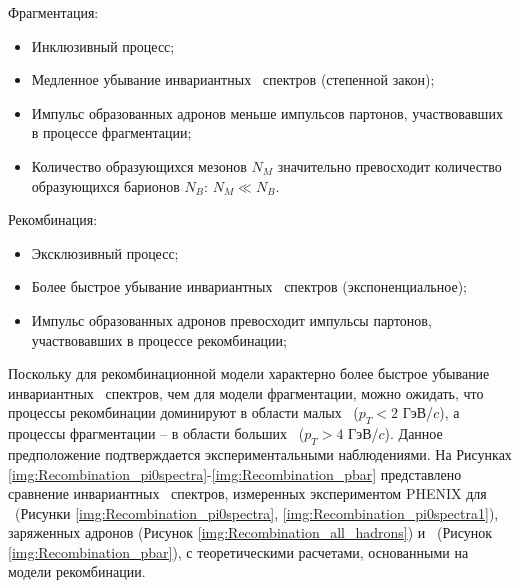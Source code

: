 Фрагментация:
\begin{itemize}[]
	\item Инклюзивный процесс;
	\item Медленное убывание инвариантных \pt \ спектров (степенной закон);
	\item Импульс образованных адронов меньше импульсов партонов, участвовавших в процессе фрагментации;
	\item Количество образующихся мезонов $N_M$ значительно превосходит количество образующихся барионов $N_B$: $N_M \ll N_B$.
\end{itemize}

Рекомбинация:
\begin{itemize}[]
	\item Эксклюзивный процесс;
	\item Более быстрое убывание инвариантных \pt \ спектров (экспоненциальное);
	\item Импульс образованных адронов превосходит импульсы партонов, участвовавших в процессе рекомбинации;
	
\end{itemize}

\begin{comment}
	Процесс фрагментации является инклюзивным, поскольку любой жесткий партон ($p_T > 5$) может фрагментировать с образованием новых адронов, тогда как для рекомбинации необходимо, чтобы они находились в на расстоянии в фазовом пространстве меньшем, чем радиус рекомбинации. 
	Инвариантный \pt \ спектр адронов, предсказываемый моделью фрагментации, имеет более медленный спад по сравнению с тем, что предсказывает модель рекомбинаци. Фрагментация значительно благоприятствует образованию мезонов, поскольку при фрагментации с гораздо большей вероятностью образуется кварк-антикварковая пара, чем дикварк [4]. 4]; при рекомбинации они образуются примерно в равной степени.
\end{comment}
Поскольку для рекомбинационной модели характерно более быстрое убывание инвариантных \pt \ спектров, чем  для модели фрагментации, можно ожидать, что процессы рекомбинации доминируют в области малых \pt \ ($p_T<2$ ГэВ/$c$), а процессы фрагментации -- в области больших \pt \ ($p_T>4$ ГэВ/$c$). Данное предположение подтверждается экспериментальными наблюдениями. На Рисунках \ref{img:Recombination_pi0spectra}-\ref{img:Recombination_pbar} представлено сравнение инвариантных \pt \ спектров, измеренных экспериментом PHENIX для \pio \ (Рисунки \ref{img:Recombination_pi0spectra}, \ref{img:Recombination_pi0spectra1}), заряженных адронов (Рисунок \ref{img:Recombination_all_hadrons}) и \aprot \ (Рисунок \ref{img:Recombination_pbar}), с теоретическими расчетами, основанными на модели рекомбинации. 

